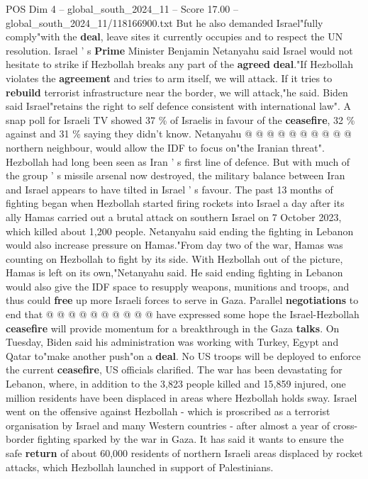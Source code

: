 \begin{textsample}{POS Dim 4 – global\_south\_2024\_11 – Score 17.00 – global\_south\_2024\_11/118166900.txt}
But he also demanded Israel"fully comply"with the \textbf{deal}, leave sites it currently occupies and to respect the UN resolution.
Israel ' s \textbf{Prime} Minister Benjamin Netanyahu said Israel would not hesitate to strike if Hezbollah breaks any part of the \textbf{agreed} \textbf{deal}."If Hezbollah violates the \textbf{agreement} and tries to arm itself, we will attack.
If it tries to \textbf{rebuild} terrorist infrastructure near the border, we will attack,"he said.
Biden said Israel"retains the right to self defence consistent with international law".
A snap poll for Israeli TV showed 37 \% of Israelis in favour of the \textbf{ceasefire}, 32 \% against and 31 \% saying they didn't know.
Netanyahu @ @ @ @ @ @ @ @ @ @ northern neighbour, would allow the IDF to focus on"the Iranian threat".
Hezbollah had long been seen as Iran ' s first line of defence.
But with much of the group ' s missile arsenal now destroyed, the military balance between Iran and Israel appears to have tilted in Israel ' s favour.
The past 13 months of fighting began when Hezbollah started firing rockets into Israel a day after its ally Hamas carried out a brutal attack on southern Israel on 7 October 2023, which killed about 1,200 people.
Netanyahu said ending the fighting in Lebanon would also increase pressure on Hamas."From day two of the war, Hamas was counting on Hezbollah to fight by its side.
With Hezbollah out of the picture, Hamas is left on its own,"Netanyahu said.
He said ending fighting in Lebanon would also give the IDF space to resupply weapons, munitions and troops, and thus could \textbf{free} up more Israeli forces to serve in Gaza.
Parallel \textbf{negotiations} to end that @ @ @ @ @ @ @ @ @ @ have expressed some hope the Israel-Hezbollah \textbf{ceasefire} will provide momentum for a breakthrough in the Gaza \textbf{talks}.
On Tuesday, Biden said his administration was working with Turkey, Egypt and Qatar to"make another push"on a \textbf{deal}.
No US troops will be deployed to enforce the current \textbf{ceasefire}, US officials clarified.
The war has been devastating for Lebanon, where, in addition to the 3,823 people killed and 15,859 injured, one million residents have been displaced in areas where Hezbollah holds sway.
Israel went on the offensive against Hezbollah - which is proscribed as a terrorist organisation by Israel and many Western countries - after almost a year of cross-border fighting sparked by the war in Gaza.
It has said it wants to ensure the safe \textbf{return} of about 60,000 residents of northern Israeli areas displaced by rocket attacks, which Hezbollah launched in support of Palestinians.

\end{textsample}

